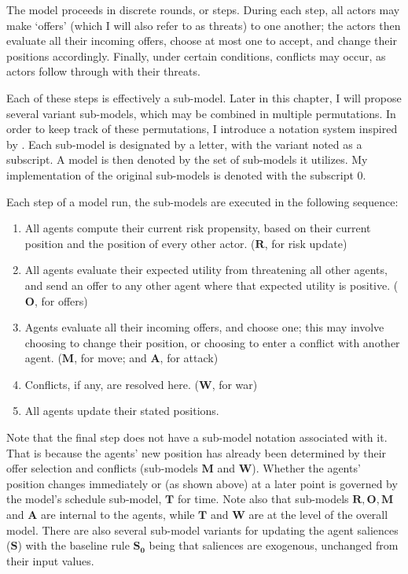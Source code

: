The model proceeds in discrete rounds, or steps. During each step, all actors may make `offers' (which I will also refer to as threats) to one another; the actors then evaluate all their incoming offers, choose at most one to accept, and change their positions accordingly. Finally, under certain conditions, conflicts may occur, as actors follow through with their threats.

Each of these steps is effectively a sub-model. Later in this chapter, I will propose several variant sub-models, which may be combined in multiple permutations. In order to keep track of these permutations, I introduce a notation system inspired by \citet{epstein_1996}. Each sub-model is designated by a letter, with the variant noted as a subscript. A model is then denoted by the set of sub-models it utilizes. My implementation of the original sub-models is denoted with the subscript $0$.

Each step of a model run, the sub-models are executed in the following sequence:

\begin{enumerate}
    \item All agents compute their current risk propensity, based on their current position and the position of every other actor. ($\mathbf{R}$, for risk update)
    \item All agents evaluate their expected utility from threatening all other agents, and send an offer to any other agent where that expected utility is positive. ($\mathbf{O}$, for offers)
    \item Agents evaluate all their incoming offers, and choose one; this may involve choosing to change their position, or choosing to enter a conflict with another agent. ($\mathbf{M}$, for move; and $\mathbf{A}$, for attack)
    \item Conflicts, if any, are resolved here. ($\mathbf{W}$, for war)
    \item All agents update their stated positions.
\end{enumerate}

Note that the final step does not have a sub-model notation associated with it. That is because the agents' new position has already been determined by their offer selection and conflicts (sub-models $\mathbf{M}$ and $\mathbf{W}$). Whether the agents' position changes immediately or (as shown above) at a later point is governed by the model's schedule sub-model, $\mathbf{T}$ for time. Note also that sub-models $\mathbf{R, O, M}$ and $\mathbf{A}$ are internal to the agents, while  $\mathbf{T}$ and $\mathbf{W}$ are at the level of the overall model. There are also several sub-model variants for updating the agent saliences ($\mathbf{S}$) with the baseline rule $\mathbf{S_0}$ being that saliences are exogenous, unchanged from their input values.

